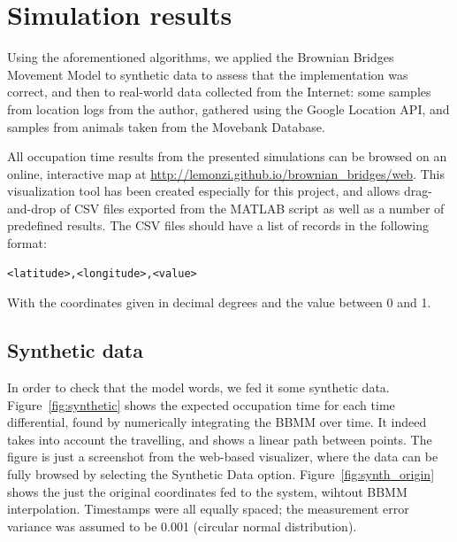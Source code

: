 \documentclass[12pt]{article}
\begin{document}

\clearpage
\section{Simulation results}

Using the aforementioned algorithms, we applied the Brownian Bridges Movement Model to synthetic data to assess that the implementation was correct, and then to real-world data collected from the Internet: some samples from location logs from the author, gathered using the Google Location API, and samples from animals taken from the Movebank Database.

All occupation time results from the presented simulations can be browsed on an online, interactive map at \url{http://lemonzi.github.io/brownian_bridges/web}. This visualization tool has been created especially for this project, and allows drag-and-drop of CSV files exported from the MATLAB script as well as a number of predefined results. The CSV files should have a list of records in the following format:

\begin{verbatim}
<latitude>,<longitude>,<value>
\end{verbatim}

With the coordinates given in decimal degrees and the value between 0 and 1.

\subsection{Synthetic data}

In order to check that the model words, we fed it some synthetic data. Figure~\ref{fig:synthetic} shows the expected occupation time for each time differential, found by numerically integrating the BBMM over time. It indeed takes into account the travelling, and shows a linear path between points. The figure is just a screenshot from the web-based visualizer, where the data can be fully browsed by selecting the Synthetic Data option. Figure~\ref{fig:synth_origin} shows the just the original coordinates fed to the system, wihtout BBMM interpolation. Timestamps were all equally spaced; the measurement error variance was assumed to be 0.001 (circular normal distribution).
\end{document}
